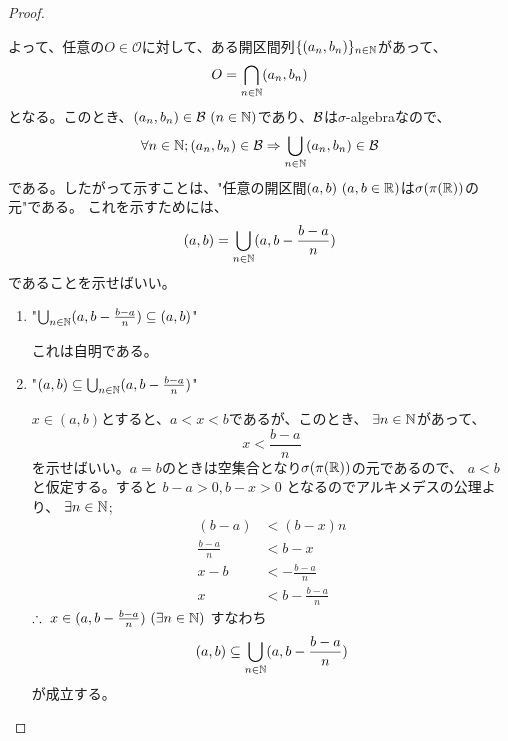 \begin{proof}
\begin{enumerate}[font = \bfseries, label = step \arabic*.]
                    よって、任意の$O\in\mathcal{O}$に対して、ある開区間列$\{(a_n, b_n)\}_{n\in{\mathbb{N}}}$があって、
                    \[
                        O = \bigcap_{n\in{\mathbb{N}}} (a_n, b_n)
                    \]
                    となる。このとき、$(a_n, b_n)\in\BB\ (n\in\NN)$であり、${\mathcal{B}}$は$\sigma$-algebraなので、
                    \[
                        \forall n \in {\mathbb{N}}; (a_n, b_n)\in{\mathcal{B}}\Rightarrow \bigcup_{n\in{\mathbb{N}}}(a_n, b_n)\in{\mathcal{B}}
                    \]
                    である。したがって示すことは、"任意の開区間$(a, b)\ (a, b\in {\mathbb{R}})$は$\sigma(\pi({\mathbb{R}}))$の元"である。
                    これを示すためには、
                    \[
                        (a, b) = \bigcup_{n\in{\mathbb{N}}}(a, b - \frac{b - a}{n})
                    \]
                    であることを示せばいい。
                    \begin{enumerate}
                        \item "$\bigcup_{n\in{\mathbb{N}}}(a, b - \frac{b - a}{n}) \subseteq (a, b)$"\par
                            これは自明である。
                        \item "$(a, b) \subseteq \bigcup_{n\in{\mathbb{N}}}(a, b - \frac{b - a}{n})$"\par
                            $x \in (a, b)$とすると、$a < x < b$であるが、このとき、
                            $\exists n\in {\mathbb{N}}$があって、
                            \[
                                x < \frac{b-a}{n}
                            \]
                            を示せばいい。$a = b$のときは空集合となり$\sigma(\pi({\mathbb{R}}))$の元であるので、
                            $a < b$と仮定する。すると
                            $b - a > 0, b - x > 0$
                            となるのでアルキメデスの公理より、
                            $\exists n \in {\mathbb{N}}$;
                            \begin{align*}
                                (b-a) &< (b-x)n \\
                                \frac{b-a}{n} &< b-x \\
                                x - b &< -\frac{b-a}{n} \\
                                x &< b - \frac{b-a}{n}
                            \end{align*}
                            $\therefore\ x\in (a, b - \frac{b-a}{n})\ (\exists n\in {\mathbb{N}})$
                            すなわち
                            \[
                                (a, b) \subseteq \bigcup_{n\in{\mathbb{N}}}(a, b - \frac{b - a}{n})
                            \]
                            が成立する。
                    \end{enumerate}
            \end{enumerate}
        \end{proof}
    